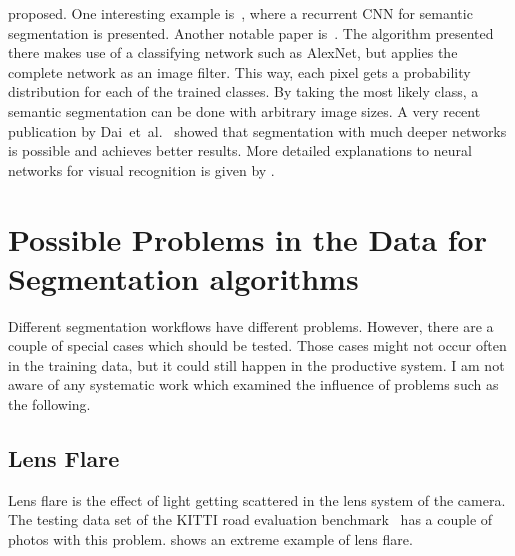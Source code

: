 \documentclass[technote,a4paper,leqno]{IEEEtran}
\begin{document}
proposed. One interesting example is~\cite{pinheiro2013recurrent}, where
a recurrent \gls{CNN} for semantic segmentation is presented.
Another notable paper is~\cite{long2014fully}. The algorithm presented there
makes use of a classifying network such as AlexNet, but applies the complete
network as an image filter. This way, each pixel gets a probability
distribution for each of the trained classes. By taking the most likely class,
a semantic segmentation can be done with arbitrary image sizes.
A very recent publication by Dai~et~al.~\cite{dai2015instance} showed that
segmentation with much deeper networks is possible and achieves better results.
More detailed explanations to neural networks for visual recognition is given
by \cite{CS231n}.
\section{Possible Problems in the Data for Segmentation algorithms}%
\label{sec:problems}
Different segmentation workflows have different problems. However, there are
a couple of special cases which should be tested. Those cases might not occur
often in the training data, but it could still happen in the productive system.
I am not aware of any systematic work which examined the influence of problems
such as the following.
\subsection{Lens Flare}
Lens flare is the effect of light getting scattered in the lens system of the
camera. The testing data set of the KITTI road evaluation
benchmark~\cite{Fritsch2013ITSC} has a couple of photos with this problem.
 shows an extreme example of lens flare.
\end{document}
